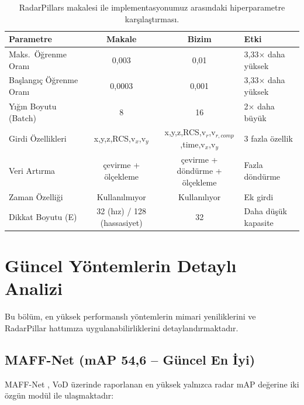 \documentclass[a4paper,11pt]{article}
\begin{document}
\begin{table}[H]
\centering
\caption{RadarPillars makalesi ile implementasyonumuz arasındaki hiperparametre karşılaştırması.}
\label{tab:config_diff}
\small
\renewcommand{\arraystretch}{1.15}
\begin{tabular}{@{}lccl@{}}
\toprule
\textbf{Parametre} & \textbf{Makale} & \textbf{Bizim} & \textbf{Etki} \\
\midrule
Maks.\ Öğrenme Oranı     & 0{,}003  & 0{,}01  & 3{,}33$\times$ daha yüksek \\
Başlangıç Öğrenme Oranı  & 0{,}0003 & 0{,}001 & 3{,}33$\times$ daha yüksek \\
Yığın Boyutu (Batch)     & 8        & 16      & 2$\times$ daha büyük \\
Girdi Özellikleri         & x,y,z,RCS,v$_{x}$,v$_{y}$ & x,y,z,RCS,v$_r$,v$_{r,comp}$,time,v$_x$,v$_y$ & 3 fazla özellik \\
Veri Artırma              & çevirme + ölçekleme & çevirme + döndürme + ölçekleme & Fazla döndürme \\
Zaman Özelliği            & Kullanılmıyor & Kullanılıyor & Ek girdi \\
Dikkat Boyutu (E)         & 32 (hız) / 128 (hassasiyet) & 32 & Daha düşük kapasite \\
\bottomrule
\end{tabular}
\end{table}

\section{Güncel Yöntemlerin Detaylı Analizi}

Bu bölüm, en yüksek performanslı yöntemlerin mimari yeniliklerini ve RadarPillar hattımıza uygulanabilirliklerini detaylandırmaktadır.

\subsection{MAFF-Net (mAP 54{,}6 -- Güncel En İyi)}

MAFF-Net \cite{maffnet}, VoD üzerinde raporlanan en yüksek yalnızca radar mAP değerine iki özgün modül ile ulaşmaktadır:
\end{document}
